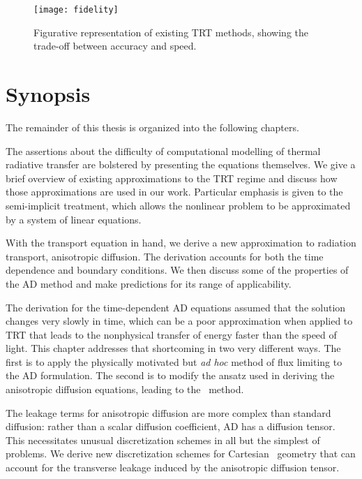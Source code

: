 \begin{figure}[htb]
  \centering
  \texttt{[image: fidelity]}
  \caption{Figurative representation of existing TRT methods, showing the
  trade-off between accuracy and speed.}
  \label{fig:fidelity}
\end{figure}



\section{Synopsis}
The remainder of this thesis is organized into the following chapters.

The assertions about the difficulty of computational modelling of thermal
radiative transfer are bolstered by presenting the equations themselves. We give
a brief overview of existing approximations to the TRT regime and discuss how
those approximations are used in our work. Particular emphasis is given to the
semi-implicit treatment, which allows the nonlinear problem to be approximated
by a system of linear equations.

With the transport equation in hand, we derive a new approximation to radiation
transport, anisotropic diffusion. The derivation accounts for both the time
dependence and boundary conditions. We then discuss some of the properties of
the AD method and make predictions for its range of applicability.

The derivation for the time-dependent AD equations assumed that the solution
changes very slowly in time, which can be a poor approximation when applied to
TRT that leads to the nonphysical transfer of energy faster than the speed of
light. This chapter addresses that shortcoming in two very different ways. The
first is to apply the physically motivated but \emph{ad hoc} method of flux
limiting to the AD formulation. The second is to modify the ansatz used in
deriving the anisotropic diffusion equations, leading to the \APone\ method.

The leakage terms for anisotropic diffusion are more complex than standard
diffusion: rather than a scalar diffusion coefficient, AD has a diffusion
tensor. This necessitates unusual discretization schemes in all but the simplest
of problems. We derive new discretization schemes for Cartesian \xy\ geometry
that can account for the transverse leakage induced by the anisotropic diffusion
tensor.

